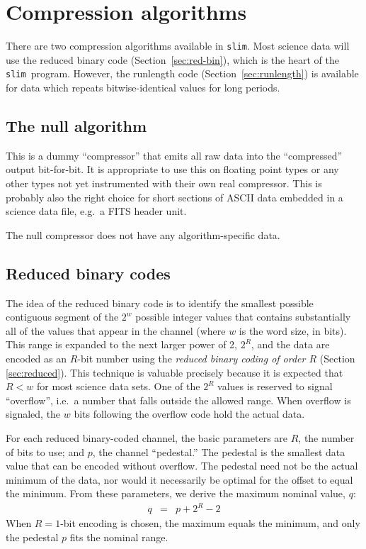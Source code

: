 \documentclass[11pt]{article}
\newcommand{\slim}{{\tt slim}}
\begin{document}
\section{Compression algorithms}
\label{sec:algorithms}

There are two compression algorithms available in \slim.  Most science
data will use the reduced binary code (Section~\ref{sec:red-bin}),
which is the heart of the \slim\ program.  However, the runlength code
(Section~\ref{sec:runlength}) is available for data which repeats
bitwise-identical values for long periods.

\subsection{The null algorithm}

This is a dummy ``compressor'' that emits all raw data into the
``compressed'' output bit-for-bit.  It is appropriate to use this on
floating point types or any other types not yet instrumented with
their own real compressor.  This is probably also the right choice for
short sections of ASCII data embedded in a science data file, e.g.\ 
a FITS header unit.

The null compressor does not have any algorithm-specific data.



\subsection{Reduced binary codes \label{sec:red-bin}}
The idea of the reduced binary code is to identify the smallest
possible contiguous segment of the $2^w$ possible integer values that
contains substantially all of the values that appear in the channel
(where $w$ is the word size, in bits).  This range is expanded to the
next larger power of 2, $2^R$, and the data are encoded as an $R$-bit
number using the \emph{reduced binary coding of order $R$} (Section
\ref{sec:reduced}).  This technique is valuable precisely because it
is expected that $R<w$ for most science data sets.  One of the $2^R$
values is reserved to signal ``overflow'', i.e.\ a number that falls
outside the allowed range.  When overflow is signaled, the $w$ bits
following the overflow code hold the actual data.

For each reduced binary-coded channel, the basic parameters are $R$,
the number of bits to use; and $p$, the channel ``pedestal.''  The
pedestal is the smallest data value that can be encoded without
overflow.  The pedestal need not be the actual minimum of the data, nor
would it necessarily be optimal for the offset to equal the minimum.
From these parameters, we derive the maximum nominal
value, $q$:
\begin{eqnarray}
q &=& p+2^{R}-2
\end{eqnarray}
When $R=1$-bit encoding is chosen, the maximum equals the
minimum, and only the pedestal $p$ fits the nominal range.
\end{document}
